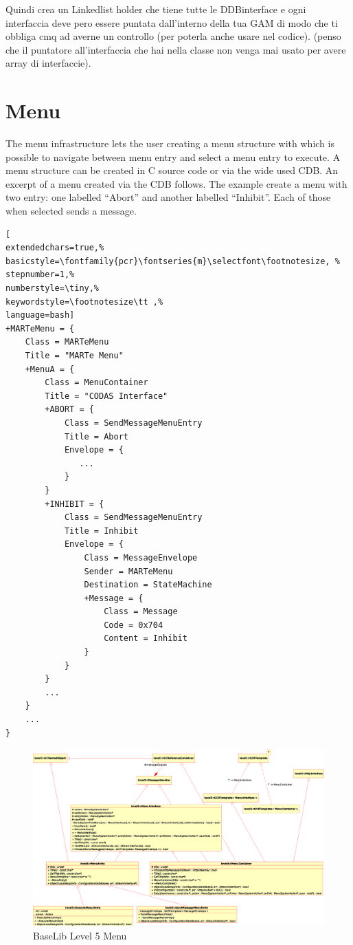Quindi crea un Linkedlist holder che tiene tutte le DDBinterface e ogni interfaccia deve pero essere puntata dall'interno della tua GAM di modo che ti obbliga cmq ad averne un controllo (per poterla anche usare nel codice). (penso che il puntatore all'interfaccia che hai nella classe non venga mai usato per avere array di interfaccie).



\section{Menu}
The menu infrastructure lets the user creating a menu structure with which is possible to navigate between menu entry and select a menu entry to execute. A menu structure can be created in C source code or via the wide used CDB. An excerpt of a menu created via the CDB follows. The example create a menu with two entry: one labelled ``Abort'' and another labelled ``Inhibit''. Each of those when selected sends a message.

\begin{lstlisting}[
extendedchars=true,%
basicstyle=\fontfamily{pcr}\fontseries{m}\selectfont\footnotesize, %
stepnumber=1,%
numberstyle=\tiny,%
keywordstyle=\footnotesize\tt ,%
language=bash]
+MARTeMenu = {
    Class = MARTeMenu
    Title = "MARTe Menu"
    +MenuA = {
        Class = MenuContainer
        Title = "CODAS Interface"
        +ABORT = {
            Class = SendMessageMenuEntry
            Title = Abort
            Envelope = {
               ...
            }
        }
        +INHIBIT = {
            Class = SendMessageMenuEntry
            Title = Inhibit
            Envelope = {
                Class = MessageEnvelope
                Sender = MARTeMenu
                Destination = StateMachine
                +Message = {
                    Class = Message
                    Code = 0x704
                    Content = Inhibit
                }
            }
        }
        ...
    }
    ...
}
\end{lstlisting}

\begin{figure}[h!]
 \begin{center}
  \includegraphics[width=\textwidth]{level5/level5-Menu-exp.eps}
  \caption{BaseLib Level 5 Menu}
  \label{f:level5:Menu}
 \end{center}
\end{figure}

